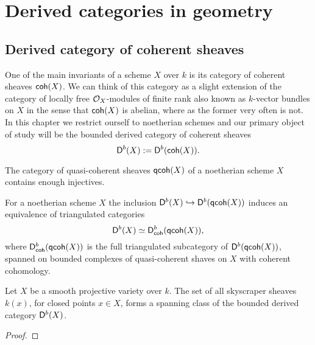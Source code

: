 \section{Derived categories in geometry}
\label{Derived categories in geometry}

\subsection{Derived category of coherent sheaves}

One of the main invariants of a scheme $X$ over $k$ is its category of coherent sheaves $\mathsf{coh}(X)$. We can think of this category as a slight extension of the category of locally free $\mathcal O_X$-modules of finite rank also known as $k$-vector bundles on $X$ in the sense that $\mathsf{coh}(X)$ is abelian, where as the former very often is not. In this chapter we restrict ourself to noetherian schemes and our primary object of study will be the bounded derived category of coherent sheaves
\[
    \mathsf{D}^b(X) := \mathsf{D}^b(\mathsf{coh}(X)).
\]

\begin{proposition}
    The category of quasi-coherent sheaves $\mathsf{qcoh}(X)$ of a noetherian scheme $X$ contains enough injectives.
\end{proposition}

\begin{proposition}
    For a noetherian scheme $X$ the inclusion $\mathsf{D}^b(X) \hookrightarrow \mathsf{D}^b(\mathsf{qcoh}(X))$ induces an equivalence of triangulated categories
    \[
        \mathsf{D}^b(X) \simeq \mathsf{D}^b_{\mathsf{coh}}(\mathsf{qcoh}(X)),
    \]
    where $\mathsf{D}^b_{\mathsf{coh}}(\mathsf{qcoh}(X))$ is the full triangulated subcategory of $\mathsf{D}^b(\mathsf{qcoh}(X))$, spanned on bounded complexes of quasi-coherent shaves on $X$ with coherent cohomology.
\end{proposition}

\begin{proposition}
    Let $X$ be a smooth projective variety over $k$. The set of all skyscraper sheaves $k(x)$, for closed points $x \in X$, forms a spanning class of the bounded derived category $\mathsf{D}^b(X)$.
\end{proposition}

\begin{proof}
    
\end{proof}

